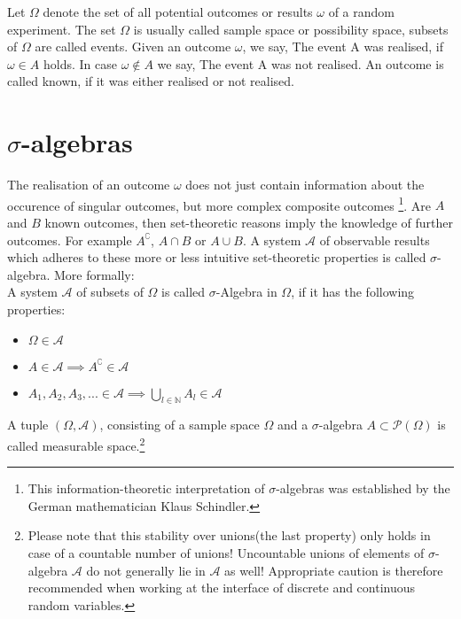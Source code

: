 \documentclass[12pt]{article}
\begin{document}
Let $\Omega$ denote the set of all potential outcomes or results $\omega$ of a random experiment. The
set $\Omega$ is usually called sample space or possibility space, subsets of $\Omega$ 
 are called events. Given an outcome $\omega$, we say, \glqq The event A was realised\grqq ,
if $\omega \in A$ holds. In case $\omega \notin A$ we say, \glqq The event A was not realised\grqq . An outcome is called known, if it was either realised or not realised.

\section{$\sigma$-algebras}
The realisation of an outcome $\omega$ does not just contain information about the occurence of singular outcomes, but more complex composite outcomes \footnote{This information-theoretic interpretation of $\sigma$-algebras was established by the German mathematician Klaus Schindler.}. Are $A$ and $B$ known outcomes, then set-theoretic reasons imply the knowledge of further outcomes. For example $A^\complement$, $A \cap B$ or $A \cup B$. A system $\mathscr{A}$ of
observable results which adheres to these more or less intuitive set-theoretic properties is called $\sigma$-algebra. More formally: \\

A system $\mathscr{A}$ of subsets of $\Omega$ is called $\sigma$-Algebra in $\Omega$, if it has the following properties:
\begin{itemize}
\item{$\Omega \in \mathscr{A}$}
\item{$A \in \mathscr{A} \implies A^\complement \in \mathscr{A}$}
\item{$A_1, A_2, A_3, ... \in \mathscr{A} \implies \bigcup\limits_{l \in \mathbb{N}} A_l \in \mathscr{A}$}
\end{itemize}
A tuple $(\Omega, \mathscr{A})$, consisting of a sample space $\Omega$
 and a $\sigma$-algebra $A \subset \mathcal{P}(\Omega)$ is called measurable space.\footnote{Please note that this \glqq stability over unions\grqq (the last property) only holds in case of a countable number of unions! Uncountable unions of elements of $\sigma$-algebra $\mathscr{A}$ do not generally lie in $\mathscr{A}$ as well! Appropriate caution is therefore recommended when working at the interface of discrete and continuous random variables.}
\end{document}
